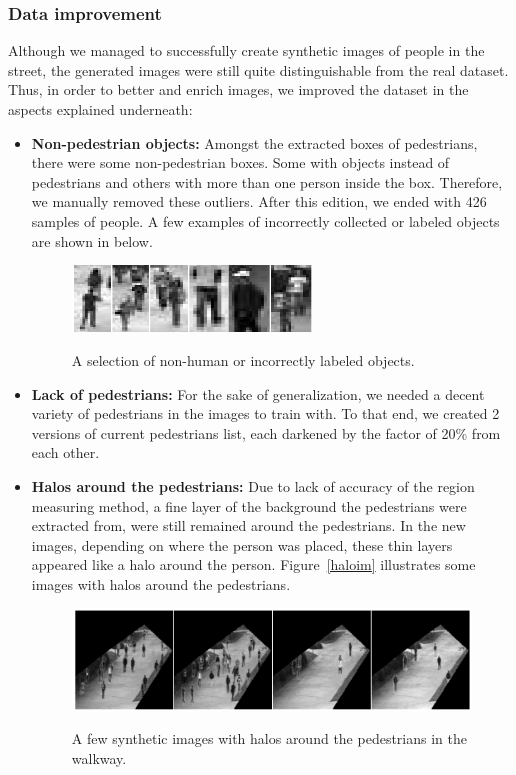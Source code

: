 \subsubsection{Data improvement}
Although we managed to successfully create synthetic images of people in the street, the generated images were still quite distinguishable from the real dataset. Thus, in order to better and enrich images, we improved the dataset in the aspects explained underneath:
\begin{itemize}
\item \textbf{Non-pedestrian objects:} Amongst the extracted boxes of pedestrians, there were some non-pedestrian boxes. Some with objects instead of pedestrians and others with more than one person inside the box. Therefore, we manually removed these outliers. After this edition, we ended with 426 samples of people. A few examples of incorrectly collected or labeled objects are shown in below.

\begin{figure}[H]
	\centering
	{\includegraphics[width=0.6\textwidth]{images/nonped}}
	\caption{A selection of non-human or incorrectly labeled objects.}
	\label{fig:nonped}
\end{figure}
 
\item \textbf{Lack of pedestrians:} For the sake of generalization, we needed a decent variety of pedestrians in the images to train with. To that end, we created 2 versions of current pedestrians list, each darkened by the factor of 20\% from each other. 
\item \textbf{Halos around the pedestrians:} Due to lack of accuracy of the region measuring method, a fine layer of the background the pedestrians were extracted from, were still remained around the pedestrians. In the new images, depending on where the person was placed, these thin layers appeared like a halo around the person. Figure~\ref{haloim} illustrates some images with halos around the pedestrians. 
\begin{figure}[H]
	\centering
	{\includegraphics[width=1\textwidth]{images/halo}}
	\caption{A few synthetic images with halos around the pedestrians in the walkway.}
	\label{fig:haloim}
\end{figure}
 

\end{itemize}
